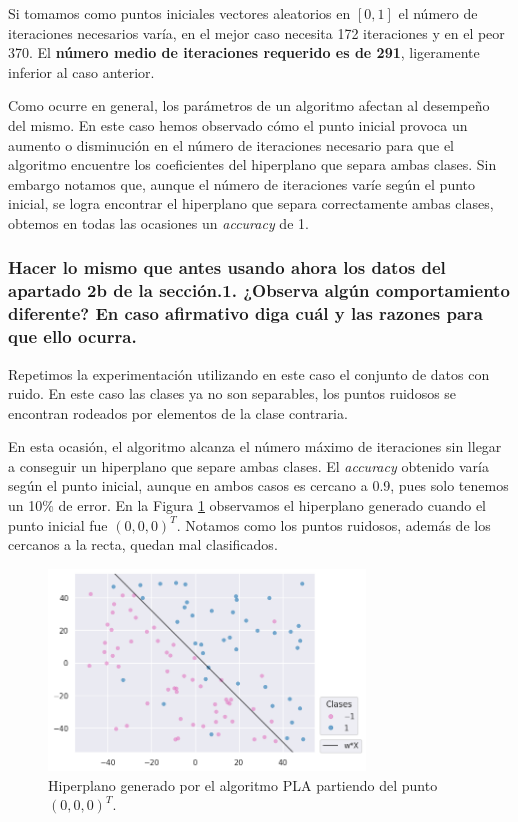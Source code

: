 \documentclass[a4paper, 20pt]{article}
\begin{document}
Si tomamos como puntos iniciales vectores aleatorios en $[0,1]$ el número de iteraciones necesarios varía, en el mejor caso necesita 172 iteraciones y en el peor 370. El \textbf{número medio de iteraciones requerido es de 291}, ligeramente inferior al caso anterior.

Como ocurre en general, los parámetros de un algoritmo afectan al desempeño del mismo. En este caso hemos observado cómo el punto inicial provoca un aumento o disminución en el número de iteraciones necesario para que el algoritmo encuentre los coeficientes del hiperplano que separa ambas clases. Sin embargo notamos que, aunque el número de iteraciones varíe según el punto inicial, se logra encontrar el hiperplano que separa correctamente ambas clases, obtemos en todas las ocasiones un \textit{accuracy} de 1.

\subsubsection{Hacer lo mismo que antes usando ahora los datos del apartado 2b de la sección.1. ¿Observa algún comportamiento diferente? En caso afirmativo diga cuál y las razones para que ello ocurra.}

Repetimos la experimentación utilizando en este caso el conjunto de datos con ruido. En este caso las clases ya no son separables, los puntos ruidosos se encontran rodeados por elementos de la clase contraria.

En esta ocasión, el algoritmo alcanza el número máximo de iteraciones sin llegar a conseguir un hiperplano que separe ambas clases. El \textit{accuracy} obtenido varía según el punto inicial, aunque en ambos casos es cercano a 0.9, pues solo tenemos un 10\% de error. En la Figura \ref{fig:21ruido} observamos el hiperplano generado cuando el punto inicial fue $(0,0,0)^T$. Notamos como los puntos ruidosos, además de los cercanos a la recta, quedan mal clasificados.

\begin{figure}[H]
    \centering
    \includegraphics[width=0.75\textwidth]{21ruido}
    \caption{Hiperplano generado por el algoritmo PLA partiendo del punto $(0,0,0)^T$.}
    \label{fig:21ruido}
\end{figure}

\newpage
\printbibliography
\end{document}
